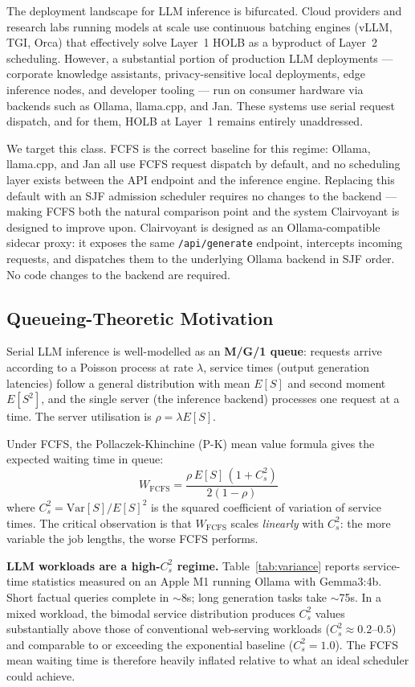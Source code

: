 \documentclass[10pt,letterpaper]{article}
\begin{document}
The deployment landscape for LLM inference is bifurcated. Cloud providers and research labs running models at scale use continuous batching engines (vLLM, TGI, Orca) that effectively solve Layer~1 HOLB as a byproduct of Layer~2 scheduling. However, a substantial portion of production LLM deployments --- corporate knowledge assistants, privacy-sensitive local deployments, edge inference nodes, and developer tooling --- run on consumer hardware via backends such as Ollama, llama.cpp, and Jan. These systems use serial request dispatch, and for them, HOLB at Layer~1 remains entirely unaddressed.

We target this class. FCFS is the correct baseline for this regime: Ollama, llama.cpp, and Jan all use FCFS request dispatch by default, and no scheduling layer exists between the API endpoint and the inference engine. Replacing this default with an SJF admission scheduler requires no changes to the backend --- making FCFS both the natural comparison point and the system Clairvoyant is designed to improve upon. Clairvoyant is designed as an Ollama-compatible sidecar proxy: it exposes the same \texttt{/api/generate} endpoint, intercepts incoming requests, and dispatches them to the underlying Ollama backend in SJF order. No code changes to the backend are required.

\subsection{Queueing-Theoretic Motivation}
\label{sec:queueing}

Serial LLM inference is well-modelled as an \textbf{M/G/1 queue}: requests arrive according to a Poisson process at rate $\lambda$, service times (output generation latencies) follow a general distribution with mean $E[S]$ and second moment $E[S^2]$, and the single server (the inference backend) processes one request at a time. The server utilisation is $\rho = \lambda E[S]$.

Under FCFS, the Pollaczek-Khinchine (P-K) mean value formula gives the expected waiting time in queue:
\[
W_{\text{FCFS}} = \frac{\rho \, E[S] \, (1 + C_s^2)}{2(1 - \rho)}
\]
where $C_s^2 = \mathrm{Var}[S] / E[S]^2$ is the squared coefficient of variation of service times. The critical observation is that $W_{\text{FCFS}}$ scales \emph{linearly} with $C_s^2$: the more variable the job lengths, the worse FCFS performs.

\textbf{LLM workloads are a high-$C_s^2$ regime.} Table~\ref{tab:variance} reports service-time statistics measured on an Apple M1 running Ollama with Gemma3:4b. Short factual queries complete in ${\sim}$8s; long generation tasks take ${\sim}$75s. In a mixed workload, the bimodal service distribution produces $C_s^2$ values substantially above those of conventional web-serving workloads ($C_s^2 \approx 0.2$--$0.5$) and comparable to or exceeding the exponential baseline ($C_s^2 = 1.0$). The FCFS mean waiting time is therefore heavily inflated relative to what an ideal scheduler could achieve.
\end{document}
